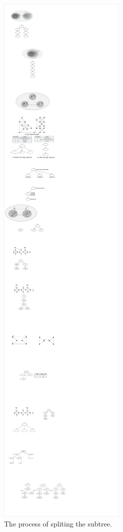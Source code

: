 \begin{figure}[ht]
    \centering
    \includegraphics[width=1\linewidth]{figures/steps}
    \caption{The process of spliting the subtree.}
    \label{fig:steps}
\end{figure}

